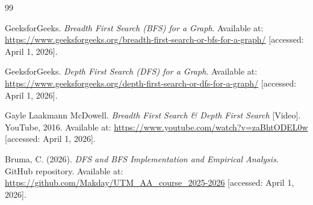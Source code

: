 \documentclass[12pt, a4paper]{report}
\begin{document}
\begin{thebibliography}{99}
\thispagestyle{plain}

  GeeksforGeeks. \textit{Breadth First Search (BFS) for a Graph}.
  Available at: \url{https://www.geeksforgeeks.org/breadth-first-search-or-bfs-for-a-graph/}
  [accessed: April 1, 2026].

  GeeksforGeeks. \textit{Depth First Search (DFS) for a Graph}.
  Available at: \url{https://www.geeksforgeeks.org/depth-first-search-or-dfs-for-a-graph/}
  [accessed: April 1, 2026].

  Gayle Laakmann McDowell. \textit{Breadth First Search \& Depth First Search} [Video].
  YouTube, 2016.
  Available at: \url{https://www.youtube.com/watch?v=zaBhtODEL0w}
  [accessed: April 1, 2026].

  Bruma, C. (2026). \textit{DFS and BFS Implementation and Empirical Analysis}.
  GitHub repository. 
  Available at: \url{https://github.com/Makday/UTM_AA_course_2025-2026}
  [accessed: April 1, 2026].

\end{thebibliography}

\end{document}
